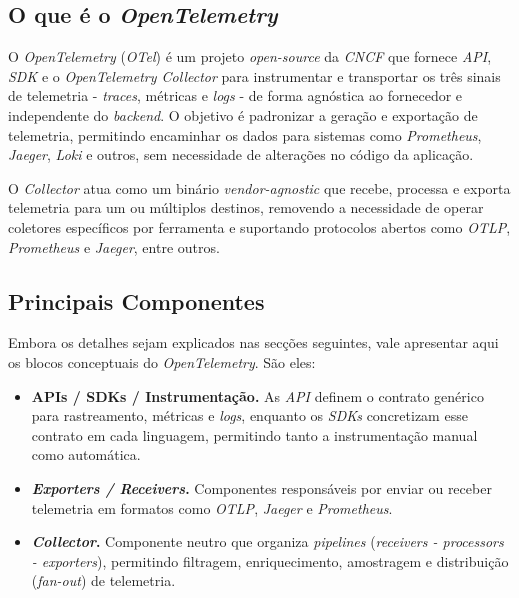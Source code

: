 \subsection{O que é o \textit{OpenTelemetry}}

O \textit{OpenTelemetry} (\textit{OTel}) é um projeto \textit{open-source} da \textit{CNCF} que fornece \textit{API}, \textit{SDK} e o \textit{OpenTelemetry Collector} para instrumentar e transportar os três sinais de telemetria - \textit{traces}, métricas e \textit{logs} - de forma agnóstica ao fornecedor e independente do \textit{backend}. O objetivo é padronizar a geração e exportação de telemetria, permitindo encaminhar os dados para sistemas como \textit{Prometheus}, \textit{Jaeger}, \textit{Loki} e outros, sem necessidade de alterações no código da aplicação.

O \textit{Collector} atua como um binário \textit{vendor-agnostic} que recebe, processa e exporta telemetria para um ou múltiplos destinos, removendo a necessidade de operar coletores específicos por ferramenta e suportando protocolos abertos como \textit{OTLP}, \textit{Prometheus} e \textit{Jaeger}, entre outros.


\subsection{Principais Componentes}

Embora os detalhes sejam explicados nas secções seguintes, vale apresentar aqui os blocos conceptuais do \textit{OpenTelemetry}. São eles:

\begin{itemize}
    \item \textbf{APIs / SDKs / Instrumentação.} As \textit{API} definem o contrato genérico para rastreamento, métricas e \textit{logs}, enquanto os \textit{SDKs} concretizam esse contrato em cada linguagem, permitindo tanto a instrumentação manual como automática.
    
    \item \textbf{\textit{Exporters / Receivers}.} Componentes responsáveis por enviar ou receber telemetria em formatos como \textit{OTLP}, \textit{Jaeger} e \textit{Prometheus}.
    
    \item \textbf{\textit{Collector}.} Componente neutro que organiza \textit{pipelines} (\textit{receivers - processors - exporters}), permitindo filtragem, enriquecimento, amostragem e distribuição (\textit{fan-out}) de telemetria.
\end{itemize}

